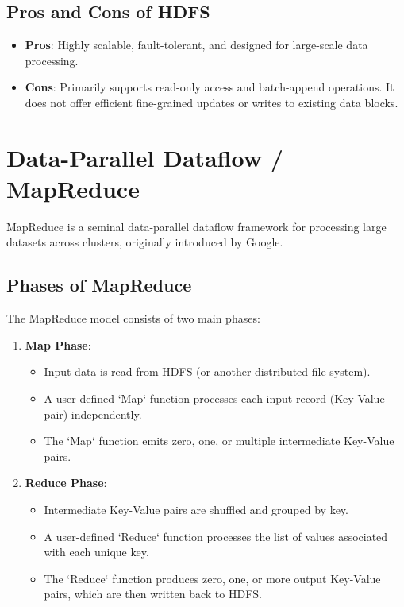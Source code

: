 \documentclass{article}
\begin{document}
\subsection*{Pros and Cons of HDFS}
\begin{itemize}
    \item \textbf{Pros}: Highly scalable, fault-tolerant, and designed for large-scale data processing.
    \item \textbf{Cons}: Primarily supports read-only access and batch-append operations. It does not offer efficient fine-grained updates or writes to existing data blocks.
\end{itemize}

\section*{Data-Parallel Dataflow / MapReduce}
MapReduce is a seminal data-parallel dataflow framework for processing large datasets across clusters, originally introduced by Google.

\subsection*{Phases of MapReduce}
The MapReduce model consists of two main phases:
\begin{enumerate}
    \item \textbf{Map Phase}:
        \begin{itemize}
            \item Input data is read from HDFS (or another distributed file system).
            \item A user-defined `Map` function processes each input record (Key-Value pair) independently.
            \item The `Map` function emits zero, one, or multiple intermediate Key-Value pairs.
        \end{itemize}
    \item \textbf{Reduce Phase}:
        \begin{itemize}
            \item Intermediate Key-Value pairs are shuffled and grouped by key.
            \item A user-defined `Reduce` function processes the list of values associated with each unique key.
            \item The `Reduce` function produces zero, one, or more output Key-Value pairs, which are then written back to HDFS.
        \end{itemize}
\end{enumerate}
\end{document}
